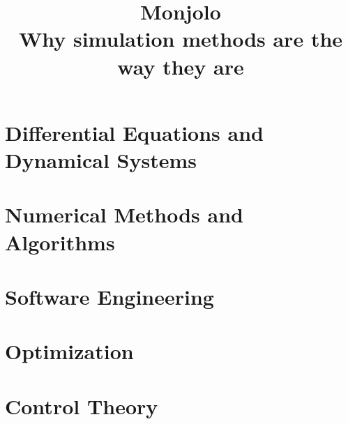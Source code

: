 \documentclass[11pt,oneside]{book}
\title{Monjolo\\[0.5em]\large Why simulation methods are the way they are}
\author{}
\date{}
\begin{document}
\frontmatter
\maketitle
\tableofcontents


\mainmatter

\part{Differential Equations and Dynamical Systems}\label{part:dynamics}

\part{Numerical Methods and Algorithms}\label{part:numerics}

\part{Software Engineering}\label{part:software}

\part{Optimization}\label{part:optimization}

\part{Control Theory}\label{part:control}
\end{document}
